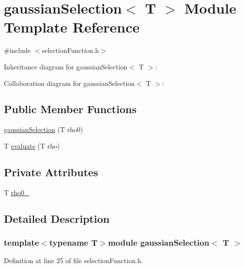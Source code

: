 \hypertarget{modulegaussian_selection}{
\section{gaussianSelection$<$ T $>$ Module Template Reference}
\label{modulegaussian_selection}
}


{\ttfamily \#include $<$selectionFunction.h$>$}



Inheritance diagram for gaussianSelection$<$ T $>$:


Collaboration diagram for gaussianSelection$<$ T $>$:
\subsection*{Public Member Functions}
\begin{DoxyCompactItemize}
\item 
\hyperlink{modulegaussian_selection_a39e61b660c4eeebb50442291f17be39e}{gaussianSelection} (T rho0)
\item 
T \hyperlink{modulegaussian_selection_ae3b45a04b50c4d6bd3444eb65430b1f7}{evaluate} (T rho)
\end{DoxyCompactItemize}
\subsection*{Private Attributes}
\begin{DoxyCompactItemize}
\item 
T \hyperlink{modulegaussian_selection_a10af7fb60964cb7b0e1b228df82e6d4b}{rho0\_\-}
\end{DoxyCompactItemize}


\subsection{Detailed Description}
\subsubsection*{template$<$typename T$>$module gaussianSelection$<$ T $>$}



Definition at line 25 of file selectionFunction.h.



